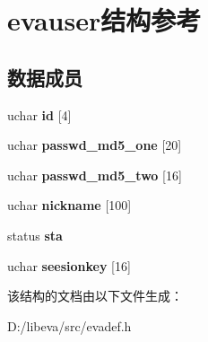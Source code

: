 \hypertarget{structevauser}{\section{evauser结构参考}
\label{structevauser}
}
\subsection*{数据成员}
\begin{DoxyCompactItemize}
\item 
\hypertarget{structevauser_af88627d48bd0a351eb17c5bd8bcee045}{uchar {\bfseries id} \mbox{[}4\mbox{]}}\label{structevauser_af88627d48bd0a351eb17c5bd8bcee045}

\item 
\hypertarget{structevauser_afc6dc45383468478a44260420bd8c92c}{uchar {\bfseries passwd\-\_\-md5\-\_\-one} \mbox{[}20\mbox{]}}\label{structevauser_afc6dc45383468478a44260420bd8c92c}

\item 
\hypertarget{structevauser_ab343f593df9d552eaa0f977ee0235add}{uchar {\bfseries passwd\-\_\-md5\-\_\-two} \mbox{[}16\mbox{]}}\label{structevauser_ab343f593df9d552eaa0f977ee0235add}

\item 
\hypertarget{structevauser_af472d73e2be1893ff7b703b81e4e47c2}{uchar {\bfseries nickname} \mbox{[}100\mbox{]}}\label{structevauser_af472d73e2be1893ff7b703b81e4e47c2}

\item 
\hypertarget{structevauser_a44d5ae1f9aba0776690796d1fe2a91ee}{status {\bfseries sta}}\label{structevauser_a44d5ae1f9aba0776690796d1fe2a91ee}

\item 
\hypertarget{structevauser_a245288db988aacc79234f07ff2fe1432}{uchar {\bfseries seesionkey} \mbox{[}16\mbox{]}}\label{structevauser_a245288db988aacc79234f07ff2fe1432}

\end{DoxyCompactItemize}


该结构的文档由以下文件生成：\begin{DoxyCompactItemize}
\item 
\-D\-:/libeva/src/evadef.\-h\end{DoxyCompactItemize}
